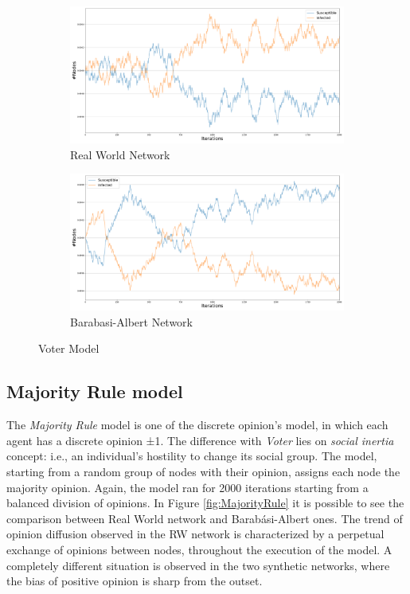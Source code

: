 \documentclass[sigchi]{acmart}
\begin{document}
\begin{figure}[h]
\centering
\begin{subfigure}[H]{1\columnwidth}
    \centering
   \includegraphics[width=.9\linewidth]{report/img/OD/Voter_0.5.pdf}
   \caption{Real World Network}
   \label{fig:RW_Voter} 
\end{subfigure}

\begin{subfigure}[H]{1\columnwidth}
   \centering
   \includegraphics[width=.9\linewidth]{report/img/OD/VoterBA_0.5.pdf}
   \caption{Barabasi-Albert Network}
   \label{fig:BA_Voter}
\end{subfigure}

\caption{Voter Model}
\label{fig:Voter}
\end{figure}

\subsection{Majority Rule model}
The \textit{Majority Rule} model is one of the discrete opinion's model, in which each agent has a discrete opinion ±1. The difference with \textit{Voter} lies on \textit{social inertia} concept: i.e., an individual's hostility to change its social group. The model, starting from a random group of nodes with their opinion, assigns each node the majority opinion. 
Again, the model ran for 2000 iterations starting from a balanced division of opinions. In Figure \ref{fig:MajorityRule} it is possible to see the comparison between Real World network and Barabási-Albert ones. The trend of opinion diffusion observed in the RW network is characterized by a perpetual exchange of opinions between nodes, throughout the execution of the model. A completely different situation is observed in the two synthetic networks, where the bias of positive opinion is sharp from the outset.
\end{document}
